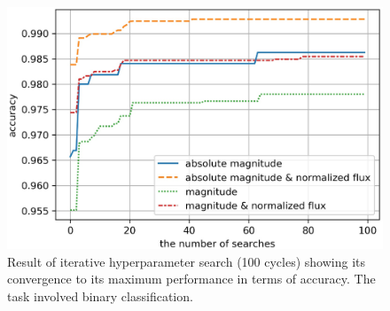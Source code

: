 \documentclass[proof]{pasj01}
\begin{document}
\begin{figure}[htbp]
  \begin{center}
     \includegraphics[width=\columnwidth]{figures/hp_iterations_accuracy.eps}
  \end{center}
  \caption{%
  Result of iterative hyperparameter search (100 cycles) showing its convergence to its maximum performance in terms of accuracy. The task involved binary classification.
  }%
  \label{fig:hp_test}
\end{figure}
%
%
%
\end{document}
